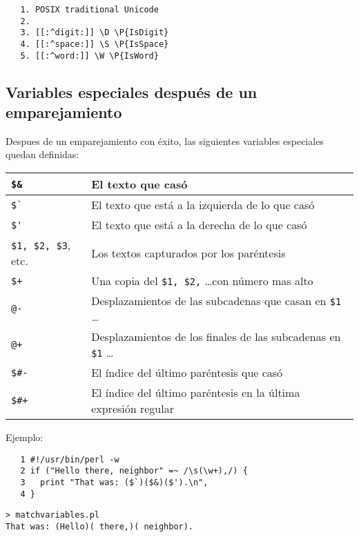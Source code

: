 \begin{verbatim}
   1. POSIX traditional Unicode
   2.
   3. [[:^digit:]] \D \P{IsDigit}
   4. [[:^space:]] \S \P{IsSpace}
   5. [[:^word:]] \W \P{IsWord}
\end{verbatim}


\subsection{Variables especiales después de un emparejamiento}
\label{section:variablesmagicasereg}
Despues de un emparejamiento con éxito, las siguientes variables 
especiales quedan definidas:

\vspace{0.5cm}
\begin{tabular}{|l|l|}
\hline
\verb|$&| & El texto que casó\\
\hline
\verb|$`| & El texto que está a la izquierda de lo que casó\\
\hline
\verb|$'| & El texto que está a la derecha de lo que casó\\
\hline
\verb|$1, $2, $3|, etc. & Los textos capturados por los paréntesis\\
\hline
\verb|$+| & Una copia del \verb|$1, $2,| \ldots con número mas alto\\
\hline
\verb|@-| & Desplazamientos de las subcadenas que casan en \verb|$1| \ldots \\
\hline
\verb|@+| & Desplazamientos de los finales de las subcadenas  en \verb|$1| \ldots \\
\hline
\verb|$#-| & El índice del último paréntesis que casó\\
\hline
\verb|$#+| & El índice del último paréntesis en la última expresión regular\\
\hline
\end{tabular}

\label{parrafo:prematch}

\vspace{0.5cm}
Ejemplo:
\begin{verbatim}
   1 #!/usr/bin/perl -w
   2 if ("Hello there, neighbor" =~ /\s(\w+),/) {
   3   print "That was: ($`)($&)($').\n",
   4 }
\end{verbatim}

\begin{verbatim}
> matchvariables.pl
That was: (Hello)( there,)( neighbor).
\end{verbatim}

